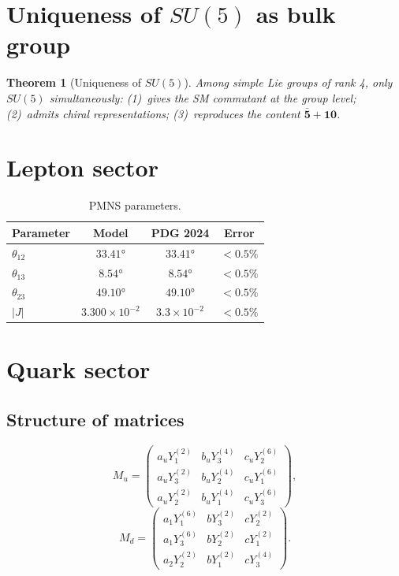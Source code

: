 \documentclass[12pt,a4paper]{article}
\numberwithin{equation}{section}
\newtheorem{theorem}{Theorem}[section]
\begin{document}
\section{Uniqueness of $SU(5)$ as bulk group}

\begin{theorem}[Uniqueness of $SU(5)$]
Among simple Lie groups of rank 4, only $SU(5)$ simultaneously:
(1)~gives the SM commutant at the group level;
(2)~admits chiral representations;
(3)~reproduces the content $\mathbf{\bar 5}+\mathbf{10}$.
\end{theorem}

\section{Lepton sector}

\begin{table}[H]
\centering
\caption{PMNS parameters.}
\begin{tabular}{lccc}
\toprule
Parameter & Model & PDG 2024 & Error \\
\midrule
$\theta_{12}$ & $33.41°$ & $33.41°$ & $<0.5\%$ \\
$\theta_{13}$ & $8.54°$  & $8.54°$  & $<0.5\%$ \\
$\theta_{23}$ & $49.10°$ & $49.10°$ & $<0.5\%$ \\
$|J|$         & $3.300\times 10^{-2}$ & $3.3\times 10^{-2}$ & $<0.5\%$ \\
\bottomrule
\end{tabular}
\end{table}

\section{Quark sector}

\subsection{Structure of matrices}

\begin{equation}
M_u = \begin{pmatrix} a_u Y_1^{(2)} & b_u Y_3^{(4)} & c_u Y_2^{(6)} \\
a_u Y_3^{(2)} & b_u Y_2^{(4)} & c_u Y_1^{(6)} \\
a_u Y_2^{(2)} & b_u Y_1^{(4)} & c_u Y_3^{(6)} \end{pmatrix},
\end{equation}
\begin{equation}
M_d = \begin{pmatrix} a_1 Y_1^{(6)} & b Y_3^{(2)} & c Y_2^{(2)} \\
a_1 Y_3^{(6)} & b Y_2^{(2)} & c Y_1^{(2)} \\
a_2 Y_2^{(2)} & b Y_1^{(2)} & c Y_3^{(4)} \end{pmatrix}.
\end{equation}
\end{document}
